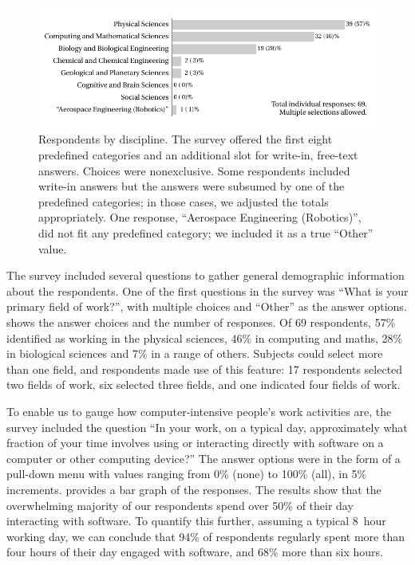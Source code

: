 \documentclass{casicswhitepaper}
\newcommand{\totalrespondents}{69\xspace}
\begin{document}
\begin{figure}[b]
  \vspace*{-2ex}
  \centering
  \includegraphics{files/plots/respondents-by-discipline.pdf}
  \vspace*{-3ex}
  \caption{Respondents by discipline.  The survey offered the first eight predefined categories and an additional slot for write-in, free-text answers.  Choices were nonexclusive.  Some respondents included write-in answers but the answers were subsumed by one of the predefined categories; in those cases, we adjusted the totals appropriately.  One response, ``Aerospace Engineering (Robotics)'', did not fit any predefined category; we included it as a true ``Other'' value.}
  \label{disciplines}
\end{figure}

The survey included several questions to gather general demographic information about the respondents.  One of the first questions in the survey was ``What is your primary field of work?'', with multiple choices and ``Other'' as the answer options.   shows the answer choices and the number of responses.  Of \totalrespondents respondents, 57\% identified as working in the physical sciences, 46\% in computing and maths, 28\% in biological sciences and 7\% in a range of others.  Subjects could select more than one field, and respondents made use of this feature: 17 respondents selected two fields of work, six selected three fields, and one indicated four fields of work.

To enable us to gauge how computer-intensive people's work activities are, the survey included the question ``In your work, on a typical day, approximately what fraction of your time involves using or interacting directly with software on a computer or other computing device?''  The answer options were in the form of a pull-down menu with values ranging from 0\% (none) to 100\% (all), in 5\% increments.   provides a bar graph of the responses.  The results show that the overwhelming majority of our respondents spend over 50\% of their day interacting with software.  To quantify this further, assuming a typical 8~hour working day, we can conclude that 94\% of respondents regularly spent more than four hours of their day engaged with software, and 68\% more than six hours.
\end{document}
